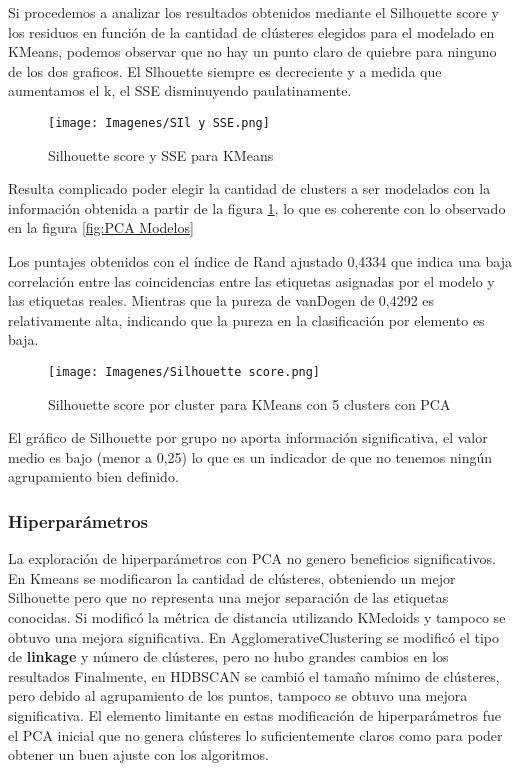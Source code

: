 \documentclass{article}
\begin{document}
Si procedemos a analizar los resultados obtenidos mediante el Silhouette score y los residuos en función de la cantidad de clústeres elegidos para el modelado en KMeans, podemos observar que no hay un punto claro de quiebre para ninguno de los dos graficos. El Slhouette siempre es decreciente y a medida que aumentamos el k, el SSE disminuyendo paulatinamente.

\begin{figure}[!htb]
    \centering
    \texttt{[image: Imagenes/SIl y SSE.png]}
    \caption{Silhouette score y SSE para KMeans}
    \label{fig:PCA Sil y SSE}
\end{figure}

Resulta complicado poder elegir la cantidad de clusters a ser modelados con la información obtenida a partir de la figura \ref{fig:PCA Sil y SSE}, lo que es coherente con lo observado en la figura \ref{fig:PCA Modelos}

Los puntajes obtenidos con el índice de Rand ajustado 0,4334 que indica una baja correlación entre las coincidencias entre las etiquetas asignadas por el modelo y las etiquetas reales.
Mientras que la pureza de vanDogen de 0,4292 es relativamente alta, indicando que la pureza en la clasificación por elemento es baja.
\clearpage
\begin{figure}[!htb]
    \centering
    \texttt{[image: Imagenes/Silhouette score.png]}
    \caption{Silhouette score por cluster para KMeans con 5 clusters con PCA}
    \label{fig:PCA Sil graph}
\end{figure}

El gráfico de Silhouette por grupo no aporta información significativa, el valor medio es bajo (menor a 0,25) lo que es un indicador de que no tenemos ningún agrupamiento bien definido.

\subsubsection{Hiperparámetros}

La exploración de hiperparámetros con PCA no genero beneficios significativos.
En Kmeans se modificaron la cantidad de clústeres, obteniendo un mejor Silhouette pero que no representa una mejor separación de las etiquetas conocidas. Si modificó la métrica de distancia utilizando KMedoids y tampoco se obtuvo una mejora significativa.
En AgglomerativeClustering se modificó el tipo de \textbf{linkage} y número de clústeres, pero no hubo grandes cambios en los resultados
Finalmente, en HDBSCAN se cambió el tamaño mínimo de clústeres, pero debido al agrupamiento de los puntos, tampoco se obtuvo una mejora significativa.
El elemento limitante en estas modificación de hiperparámetros fue el PCA inicial que no genera clústeres lo suficientemente claros como para poder obtener un buen ajuste con los algoritmos.
\end{document}
